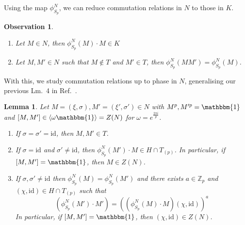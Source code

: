 \documentclass[aps,pra,letterpaper,onrcolumn,nofootinbib,notitlepage,longbibliography]{revtex4-1}
\newtheorem{lemma}{Lemma}
\newtheorem{obv}{Observation}
\newcommand{\one}{\mathbbm{1}}
\newcommand{\id}{\mathrm{id}}
\newcommand{\Z}{\mathbb Z}
\begin{document}
Using the map $\phi^N_{S_p}$, we can reduce commutation relations in $N$ to those in $K$.

\begin{obv}{\label{obv:tildeK to K}}
    \begin{enumerate}
        \item Let $M\in N$, then $\phi^N_{S_p}(M)\cdot M\in K$
        \item Let $M,M'\in N$ such that $M\not\in T$ and $M'\in T$, then $\phi^N_{S_p}(MM')=\phi^N_{S_p}(M)$.
    \end{enumerate}
\end{obv}

With this, we study commutation relations up to phase in $N$, generalising our previous Lm.~4 in Ref.~\cite{FrembsChungOkay2022}. 

\begin{lemma}\label{lem: comm_tildeK}
    Let $M=(\xi,\sigma),M'=(\xi',\sigma')\in N$ with $M^p,M'^p=\one$ and $[M,M']\in \langle\omega\one\rangle=Z(N)$ for $\omega=e^{\frac{2\pi i}{p}}$.
    \begin{enumerate}
    \item If $\sigma=\sigma'=\id$, then $M,M'\in T$.
    \item If $\sigma=\id$ and $\sigma'\neq\id$, then $\phi^N_{S_p}(M')\cdot M\in H\cap T_{(p)}$. In particular, if $[M,M']=\one$, then $M\in Z(N)$.
    \item If $\sigma,\sigma'\neq\id$ then $\phi^N_{S_p}(M)=\phi^N_{S_p}(M')$ and there exists $a\in\Z_p$ and $(\chi,\id)\in H\cap T_{(p)}$ such that
    $$\left(\phi^N_{S_p}(M')\cdot M'\right)=\left((\phi^N_{S_p}(M)\cdot M)(\chi,\id)\right)^a$$ In particular, if $[M,M']=\one$, then $(\chi,\id)\in Z(N)$.
    \end{enumerate}
\end{lemma}
\end{document}
